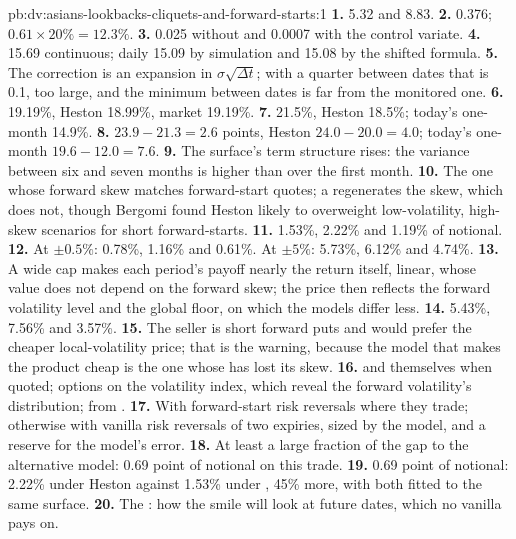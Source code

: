 \begin{solution}{pb:dv:asians-lookbacks-cliquets-and-forward-starts:1}
\textbf{1.} 5.32 and 8.83.
\textbf{2.} 0.376; $0.61\times20\%=12.3\%$.
\textbf{3.} 0.025 without and 0.0007 with the control variate.
\textbf{4.} 15.69 continuous; daily 15.09 by simulation and 15.08 by the shifted formula.
\textbf{5.} The correction is an expansion in $\sigma\sqrt{\Delta t}$; with a quarter between dates that is 0.1, too large, and
the minimum between dates is far from the monitored one.
\textbf{6.}  19.19\%, Heston 18.99\%, market 19.19\%.
\textbf{7.}  21.5\%, Heston 18.5\%; today's one-month 14.9\%.
\textbf{8.}  $23.9-21.3=2.6$ points, Heston $24.0-20.0=4.0$; today's one-month $19.6-12.0=7.6$.
\textbf{9.} The surface's term structure rises: the variance between six and seven months is higher than over the first
month.
\textbf{10.} The one whose forward skew matches forward-start quotes; a  regenerates the skew,
which  does not, though Bergomi found Heston likely to overweight low-volatility, high-skew scenarios
for short forward-starts.
\textbf{11.} 1.53\%, 2.22\% and 1.19\% of notional.
\textbf{12.} At $\pm0.5\%$: 0.78\%, 1.16\% and 0.61\%. At $\pm5\%$: 5.73\%, 6.12\% and 4.74\%.
\textbf{13.} A wide cap makes each period's payoff nearly the return itself, linear, whose value does not depend on the
forward skew; the price then reflects the forward volatility level and the global floor, on which the models differ less.
\textbf{14.} 5.43\%, 7.56\% and 3.57\%.
\textbf{15.} The seller is short forward puts and would prefer the cheaper local-volatility price; that is the warning,
because the model that makes the product cheap is the one whose  has lost its skew.
\textbf{16.}  and  themselves when quoted; options on the volatility index, which reveal the
forward volatility's distribution;  from .
\textbf{17.} With forward-start risk reversals where they trade; otherwise with vanilla risk reversals of two expiries,
sized by the model, and a reserve for the model's error.
\textbf{18.} At least a large fraction of the gap to the alternative model: 0.69 point of notional on this trade.
\textbf{19.} 0.69 point of notional: 2.22\% under Heston against 1.53\% under , 45\% more, with both fitted to
the same surface.
\textbf{20.} The : how the smile will look at future dates, which no vanilla pays on.
\end{solution}

